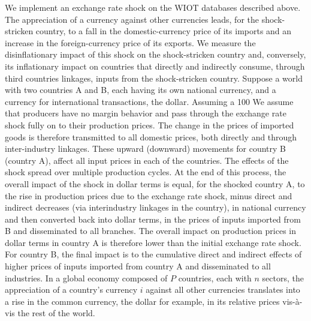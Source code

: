 \documentclass[11pt,a4paper]{article}
\begin{document}
We implement an exchange rate shock on the WIOT databases described above. The appreciation of a currency against other currencies leads, for the shock-stricken country, to a fall in the domestic-currency price of its imports and an increase in the foreign-currency price of its exports. We measure the disinflationary impact of this shock on the shock-stricken country and, conversely, its inflationary impact on countries that directly and indirectly consume, through third countries linkages, inputs from the shock-stricken country.
Suppose a world with two countries A and B, each having its own national currency, and a currency for international transactions, the dollar. Assuming a 100%
We assume that producers have no margin behavior and pass through the exchange rate shock fully on to their production prices. The change in the prices of imported goods is therefore transmitted to all domestic prices, both directly and through inter-industry linkages. These upward (downward) movements for country B (country A), affect all input prices in each of the countries.
The effects of the shock spread over multiple production cycles. At the end of this process, the overall impact of the shock in dollar terms is equal, for the shocked country A, to the rise in production prices due to the exchange rate shock, minus direct and indirect decreases (via interindustry linkages in the country), in national currency and then converted back into dollar terms, in the prices of inputs imported from B and disseminated to all branches. The overall impact on production prices in dollar terms in country A is therefore lower than the initial exchange rate shock. For country B, the final impact is to the cumulative direct and indirect effects of higher prices of inputs imported from country A and disseminated to all industries.
In a global economy composed of $P$ countries, each with $n$ sectors, the appreciation of a country's currency $i$ against all other currencies translates into a rise in the common currency, the dollar for example, in its relative prices vis-à-vis the rest of the world. 
\end{document}
